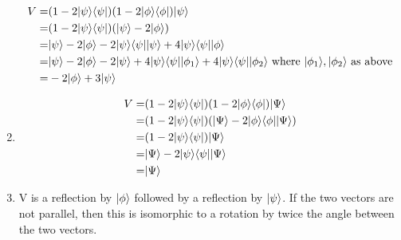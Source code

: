 \documentclass{assignment}
\begin{document}
\begin{problemlist}
\begin{answer}
\begin{enumerate}
\begin{align*}
        V =& (1-2\ket{\psi}\bra{\psi})(1-2\ket{\phi}\bra{\phi})\ket{\psi}\\
        =& (1-2\ket{\psi}\bra{\psi})(\ket{\psi} - 2\ket{\phi})\\
        =& \ket{\psi} - 2\ket{\phi} - 2\ket{\psi}\bra{\psi}\ket{\psi} + 4\ket{\psi}\bra{\psi}\ket{\phi}\\
        =& \ket{\psi} - 2\ket{\phi} - 2\ket{\psi} + 4\ket{\psi}\bra{\psi}\ket{\phi_1}+ 4\ket{\psi}\bra{\psi}\ket{\phi_2} \text{ where }\ket{\phi_1},\ket{\phi_2}\text{ as above}\\
      =& -2\ket{\phi} + 3\ket{\psi}\\
      \end{align*}
    \item
      \begin{align*}
        V =& (1-2\ket{\psi}\bra{\psi})(1-2\ket{\phi}\bra{\phi})\ket{\Psi}\\
        =& (1-2\ket{\psi}\bra{\psi})(\ket{\Psi}-2\ket{\phi}\bra{\phi}\ket{\Psi})\\
        =& (1-2\ket{\psi}\bra{\psi})\ket{\Psi}\\
        =& \ket{\Psi}-2\ket{\psi}\bra{\psi}\ket{\Psi}\\
        =& \ket{\Psi}\\
      \end{align*}
      \item V is a reflection by $\ket{\phi}$ followed by a reflection by $\ket{\psi}$. If the two vectors are not parallel, then this is isomorphic to a rotation by twice the angle between the two vectors.
    \end{enumerate}
  \end{answer}


\end{problemlist}
\end{document}
